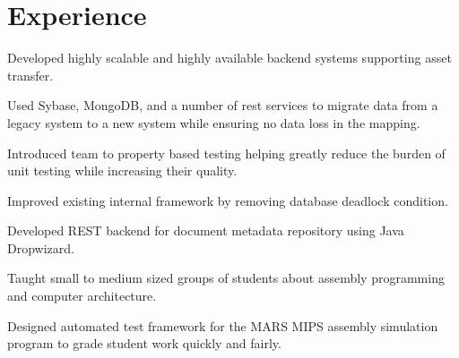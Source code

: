 \documentclass[letterpaper]{deedy-resume} %
\begin{document}
\begin{minipage}[t]{0.64\textwidth} %


\section{Experience}

\vspace{\topsep} %
\begin{tightitemize}
	\item Developed highly scalable and highly available backend systems supporting asset transfer.
	\item Used Sybase, MongoDB, and a number of rest services to migrate data from a legacy system to a new system while ensuring no data loss in the mapping.
	\item Introduced team to property based testing helping greatly reduce the burden of unit testing while increasing their quality.
\end{tightitemize}

\vspace{\topsep} %
\begin{tightitemize}
\item Improved existing internal framework by removing database deadlock condition.
\item Developed REST backend for document metadata repository using Java Dropwizard.
\end{tightitemize}


\begin{tightitemize}
\item Taught small to medium sized groups of students about assembly programming and computer architecture.
\item Designed automated test framework for the MARS MIPS assembly simulation program to grade student work quickly and fairly.
\end{tightitemize}


\end{minipage}
\end{document}
